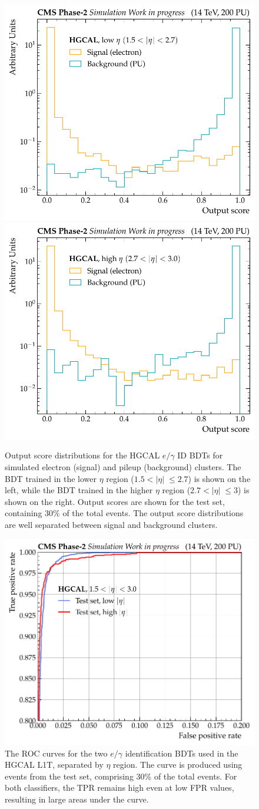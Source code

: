 \begin{figure}[htbp!]
\centering
\includegraphics[width=0.49\linewidth]{Figures/Detector/HGCAL/InputsOutputs/EGID_output_score_low_eta.pdf}\hfill%
\includegraphics[width=0.49\linewidth]{Figures/Detector/HGCAL/InputsOutputs/EGID_output_score_high_eta.pdf}
\caption[Output score distributions for the HGCAL L1T $e/\gamma$ identification BDTs.]{Output score distributions for the HGCAL $e/\gamma$ ID BDTs for simulated electron (signal) and pileup (background) clusters. The BDT trained in the lower $\eta$ region ($1.5 < |\eta|\; \leq 2.7$) is shown on the left, while the BDT trained in the higher $\eta$ region ($2.7 < |\eta|\; \leq 3$) is shown on the right. Output scores are shown for the test set, containing 30\% of the total events. The output score distributions are well separated between signal and background clusters.}
\label{fig:HGCAL_egid_output}
\end{figure}

\begin{figure}[htbp!]
\centering
\includegraphics[width=0.54\linewidth]{Figures/Detector/HGCAL/InputsOutputs/EGID_ROC_curve_all_eta.pdf}\hfill%
\caption[The ROC curves for the HGCAL L1T $e/\gamma$ identification BDTs.]{The ROC curves for the two $e/\gamma$ identification BDTs used in the HGCAL L1T, separated by $\eta$ region. The curve is produced using events from the test set, comprising 30\% of the total events. For both classifiers, the TPR remains high even at low FPR values, resulting in large areas under the curve.}
\label{fig:HGCAL_egid_ROC}
\end{figure}

